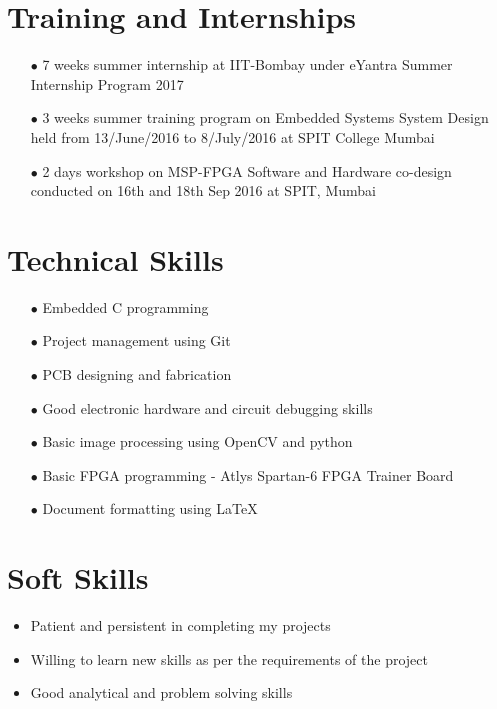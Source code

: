 \documentclass{article}
\begin{document}
	\section*{Training and Internships}
	\begin{itemize}
		\item[$\bullet$] 7 weeks summer internship at IIT-Bombay under eYantra Summer Internship Program 2017
		\item[$\bullet$] 3 weeks summer training program on Embedded Systems System Design held from 13/June/2016 to 8/July/2016 at SPIT College Mumbai
		\item[$\bullet$] 2 days workshop on MSP-FPGA Software and Hardware co-design conducted on 16th and 18th Sep 2016 at SPIT, Mumbai
	\end{itemize} 
		
	\section*{Technical Skills}
	\begin{itemize}
		\item[$\bullet$] Embedded C programming
		\item[$\bullet$] Project management using Git
		\item[$\bullet$] PCB designing and fabrication
		\item[$\bullet$] Good electronic hardware and circuit debugging skills
		\item[$\bullet$] Basic image processing using OpenCV and python
		\item[$\bullet$] Basic FPGA programming - Atlys Spartan-6 FPGA Trainer Board
		\item[$\bullet$] Document formatting using \LaTeX
	\end{itemize}
	
	\section*{Soft Skills}
	\begin{itemize}
		\item Patient and persistent in completing my projects
		\item Willing to learn new skills as per the requirements of the project
		\item Good analytical and problem solving skills
	\end{itemize}
	
\end{document}
